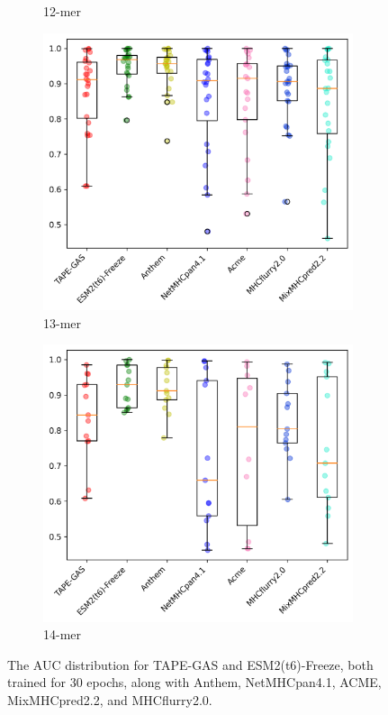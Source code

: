 \begin{figure}[h]
\begin{subfigure}[b]{0.3\textwidth}
		\caption{12-mer}
		\label{fig:comparison_12}
	\end{subfigure}
	\hfill
	\begin{subfigure}[b]{0.3\textwidth}
		\centering
		\includegraphics[width=\textwidth]{../img/results/auc_distribution_13-mer}
		\caption{13-mer}
		\label{fig:comparison_13}
	\end{subfigure}
	\hfill
	\begin{subfigure}[b]{0.3\textwidth}
		\centering
		\includegraphics[width=\textwidth]{../img/results/auc_distribution_14-mer}
		\caption{14-mer}
		\label{fig:comparison_14}
	\end{subfigure}
	\caption{The AUC distribution for TAPE-GAS and ESM2(t6)-Freeze, both trained for 30 epochs, along with Anthem, NetMHCpan4.1, ACME, MixMHCpred2.2, and MHCflurry2.0.}
	\label{fig:auc_distribution}
\end{figure}
